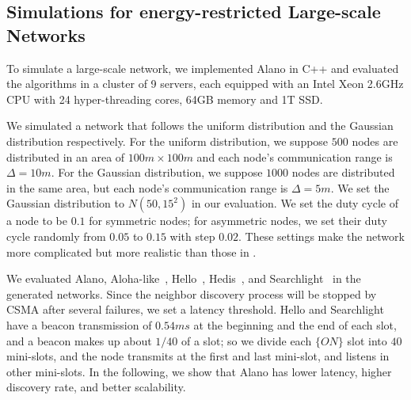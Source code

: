 \subsection{Simulations for energy-restricted Large-scale Networks}


To simulate a large-scale network, we implemented Alano in C++ and evaluated the algorithms in a cluster of 9 servers,
each equipped with an Intel Xeon 2.6GHz CPU with 24 hyper-threading cores, 64GB memory and 1T SSD.

We simulated a network that follows the uniform distribution and the
Gaussian distribution respectively.
For the uniform distribution, we suppose $500$ nodes are distributed in an area of $100m \times 100m$ 
and each node's communication range is $\Delta = 10m$. For the Gaussian distribution, we suppose 
$1000$ nodes are distributed in the same area, but each node's communication range is $\Delta = 5m$. 
We set the Gaussian distribution to $N(50,15^2)$ in our evaluation.
We set the duty cycle of a node to be $0.1$ for symmetric nodes; 
for asymmetric nodes, we set their duty cycle randomly from $0.05$ to $0.15$ with step $0.02$.
These settings make the network more complicated but more realistic than
those in
\cite{wang2015blinddate, sun2014hello, bakht2012searchlight,
chen2015heterogeneous, kandhalu2010u, you2011aloha,
mcglynn2001birthday, song2014probabilistic, vasudevan2009neighbor}.


We evaluated Alano, Aloha-like~\cite{you2011aloha}, Hello~\cite{sun2014hello}, Hedis~\cite{chen2015heterogeneous}, and Searchlight~\cite{bakht2012searchlight} in the generated networks.
Since the neighbor discovery process will be stopped by CSMA after several failures, we set a latency threshold.
Hello and Searchlight have a beacon transmission of $0.54ms$ at the
beginning and the end of each slot, and a beacon makes up about $1/40$ of a
slot; so we divide each $\{ON\}$ slot into $40$ mini-slots, and the node
transmits at the first and last mini-slot, and listens in other
mini-slots.
In the following, we show that Alano has lower latency, higher discovery
rate, and better scalability. %




